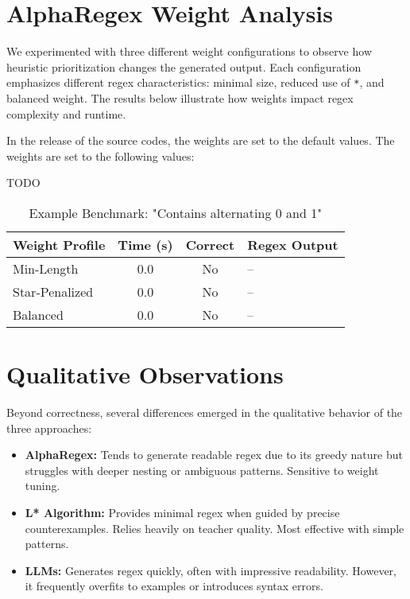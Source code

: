 \section{AlphaRegex Weight Analysis}

\indent\indent We experimented with three different weight configurations to observe how heuristic prioritization changes the generated output. Each configuration emphasizes different regex characteristics: minimal size, reduced use of \texttt{*}, and balanced weight. The results below illustrate how weights impact regex complexity and runtime.

In the release of the source codes, the weights are set to the default values. The weights are set to the following values:

TODO 

\begin{table}[h!]
\centering
\caption{Example Benchmark: "Contains alternating 0 and 1"}
\begin{tabular}{|l|c|c|l|}
\hline
\textbf{Weight Profile} & \textbf{Time (s)} & \textbf{Correct} & \textbf{Regex Output} \\
\hline
Min-Length & 0.0 & No & -- \\
Star-Penalized & 0.0 & No & -- \\
Balanced & 0.0 & No & -- \\
\hline
\end{tabular}
\end{table}

\section{Qualitative Observations}

\indent\indent Beyond correctness, several differences emerged in the qualitative behavior of the three approaches:

\begin{itemize}
\item \textbf{AlphaRegex:} Tends to generate readable regex due to its greedy nature but struggles with deeper nesting or ambiguous patterns. Sensitive to weight tuning.
\item \textbf{L* Algorithm:} Provides minimal regex when guided by precise counterexamples. Relies heavily on teacher quality. Most effective with simple patterns.
\item \textbf{LLMs:} Generates regex quickly, often with impressive readability. However, it frequently overfits to examples or introduces syntax errors.
\end{itemize}

